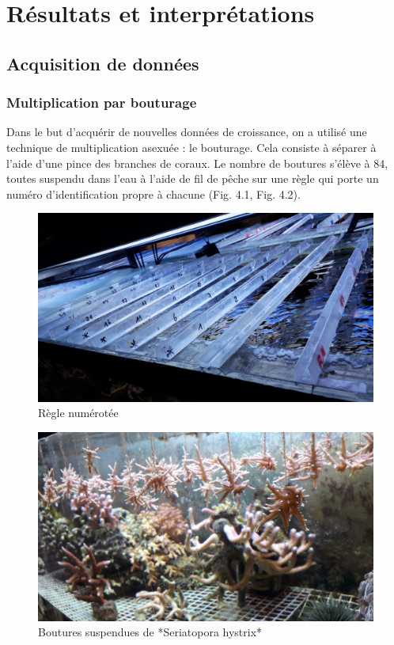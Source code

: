 \documentclass[]{article}
\title{}
\author{}
\date{}
\begin{document}
\section{Résultats et
interprétations}\label{resultats-et-interpretations}

\subsection{Acquisition de données}\label{acquisition-de-donnees}

\subsubsection{Multiplication par
bouturage}\label{multiplication-par-bouturage}

Dans le but d'acquérir de nouvelles données de croissance, on a utilisé
une technique de multiplication asexuée : le bouturage. Cela consiste à
séparer à l'aide d'une pince des branches de coraux. Le nombre de
boutures s'élève à 84, toutes suspendu dans l'eau à l'aide de fil de
pêche sur une règle qui porte un numéro d'identification propre à
chacune (Fig. 4.1, Fig. 4.2).

\begin{figure}[h!]
\includegraphics[]{../image/regle.jpg}
\caption{Règle numérotée}
\end{figure}

\begin{figure}[h!]
\includegraphics[]{../image/boutures.jpg}
\caption{Boutures suspendues de *Seriatopora hystrix*}
\end{figure}
\end{document}
